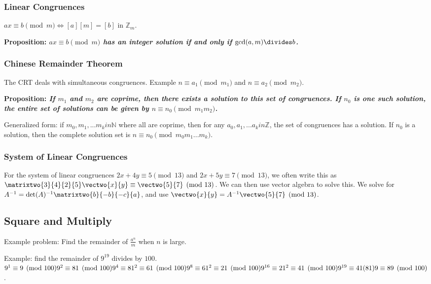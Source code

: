 \documentclass[12pt]{article}
\newcommand{\proposition}[1]{{\bf Proposition: \textit{#1}}}
\begin{document}
\subsubsection*{Linear Congruences}
$ax \equiv b \pmod m \iff [a][m] = [b]$ in $\mathbb{Z}_m$.

\proposition{$ax \equiv b \pmod m$ has an integer solution if and only if $\gcd(a,m) \divides b$.}

\subsubsection*{Chinese Remainder Theorem}
The CRT deals with simultaneous congruences. Example $n \equiv a_1 \pmod m_1$ and $n \equiv a_2 \pmod m_2$.

\proposition{If $m_1$ and $m_2$ are coprime, then there exists a solution to this set of congruences. If $n_0$ is one such solution, the entire set of solutions can be given by $n \equiv n_0 \pmod{m_1m_2}$.}

Generalized form: if $m_0, m_1, ... m_k in \mathbb{N}$ where all are coprime, then for any $a_0, a_1, ... a_k in \mathbb{Z}$, the set of congruences has a solution. If $n_0$ is a solution, then the complete solution set is $n \equiv n_0 \pmod{m_0m_1...m_k}$.

\subsubsection*{System of Linear Congruences}
For the system of linear congruences $2x + 4y \equiv 5 \pmod{13}$ and $2x + 5y \equiv 7 \pmod{13}$, we often write this as $\matrixtwo{3}{4}{2}{5} \vectwo{x}{y} \equiv \vectwo{5}{7} \pmod{13}$. We can then use vector algebra to solve this. We solve for $A^{-1} = \det(A)^{-1} \matrixtwo{b}{-b}{-c}{a}$, and use $\vectwo{x}{y} = A^{-1} \vectwo{5}{7} \pmod{13}$.

\subsection*{Square and Multiply}
Example problem: Find the remainder of $\frac{a^n}{m}$ when $n$ is large.

Example: find the remainder of $9^19$ divides by $100$.\\
$9^1 \equiv 9 \pmod{100}\\
9^2 \equiv 81 \pmod{100}\\
9^4 \equiv 81^2 \equiv 61 \pmod{100}\\
9^8 \equiv 61^2 \equiv 21 \pmod{100}\\
9^{16} \equiv 21^2 \equiv 41 \pmod{100}\\
9^{19} \equiv 41(81)9 \equiv 89 \pmod{100}$.
\end{document}
